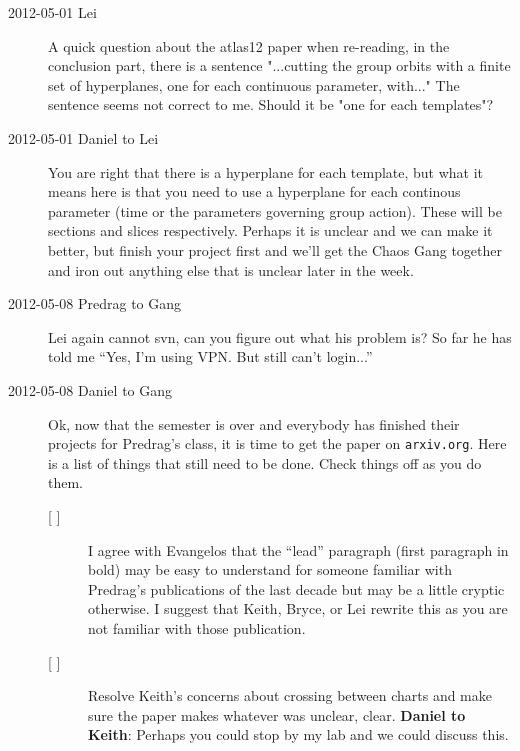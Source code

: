 \begin{description}
\item[2012-05-01 Lei] A quick question about the atlas12 paper when re-reading, in the conclusion part, there is a sentence "...cutting the group orbits with a finite set of hyperplanes, one for each continuous parameter, with..." The sentence seems not correct to me. Should it be "one for each templates"?

\item[2012-05-01 Daniel to Lei] You are right that there is a hyperplane for each template, but what it means here is that you need to use a hyperplane for each continous parameter (time or the parameters governing group action). These will be sections and slices respectively. Perhaps it is unclear and we can make it better, but finish your project first and we'll get the Chaos Gang together and iron out anything else that is unclear later in the week.

\item[2012-05-08 Predrag to Gang]  Lei again cannot svn, can you figure
out what his problem is? So far he has told me ``Yes, I'm using VPN. But
still can't login...''

\item[2012-05-08 Daniel to Gang] Ok, now that the semester is over and
everybody has finished their projects for Predrag's class, it is time to
get the paper on \texttt{arxiv.org}. Here is a list of things that still
need to be done. Check things off as you do them.

\begin{description}

\item[{[ ]}] I agree with Evangelos that the ``lead'' paragraph (first paragraph in bold) may be easy to understand for someone familiar with Predrag's publications of the last decade but may be a little cryptic otherwise. I suggest that Keith, Bryce, or Lei rewrite this as you are not familiar with those publication.

\item[{[ ]}] Resolve Keith's concerns about crossing between charts and make sure the paper makes whatever was unclear, clear. {\bf Daniel to Keith}: Perhaps you could stop by my lab and we could discuss this.


\end{description}
\end{description}
